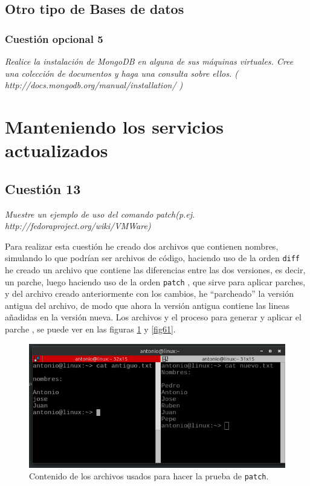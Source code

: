 \subsection{Otro tipo de Bases de datos}
\subsubsection{Cuestión opcional 5}
\textit{Realice la instalación de MongoDB en alguna de sus máquinas virtuales. Cree una colección de documentos y haga una consulta sobre ellos. ( http://docs.mongodb.org/manual/installation/ )}







\section{Manteniendo los servicios actualizados}
\subsection{Cuestión 13}
\textit{Muestre un ejemplo de uso del comando patch(p.ej. http://fedoraproject.org/wiki/VMWare)}
\newline

Para realizar esta cuestión he creado dos archivos que contienen nombres, simulando lo que podrían ser archivos de código, haciendo uso de la orden \texttt{diff} \cite{diff} he creado un archivo que contiene las diferencias entre las dos versiones, es decir, un parche, luego haciendo uso de la orden \texttt{patch} \cite{patch}, que sirve para aplicar parches, y del archivo creado anteriormente con los cambios, he ``parcheado'' la versión antigua del archivo, de modo que ahora  la versión antigua contiene las lineas añadidas en la versión nueva. Los archivos y el proceso para generar y aplicar el parche , se puede ver en las figuras \ref{fig60} y \ref{fig61}.


\begin{figure}[H]
    \begin{center}
        \includegraphics[scale=0.5]{imagenes/img61}
        \caption{Contenido de los archivos usados para hacer la prueba de \texttt{patch}.}
        \label{fig60}
    \end{center}
\end{figure}

